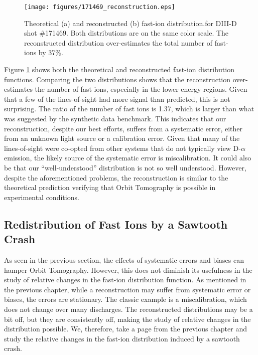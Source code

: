\begin{figure}[h!]
    \centering
    \texttt{[image: figures/171469\_reconstruction.eps]}
    \caption{Theoretical (a) and reconstructed (b) fast-ion distribution.for DIII-D shot \#171469. Both distributions are on the same color scale. The reconstructed distribution over-estimates the total number of fast-ions by 37\%.}
    \label{fig:d3d_reconstruction}
\end{figure}
Figure \ref{fig:d3d_reconstruction} shows both the theoretical and reconstructed fast-ion distribution functions. Comparing the two distributions shows that the reconstruction over-estimates the number of fast ions, especially in the lower energy regions. Given that a few of the lines-of-sight had more signal than predicted, this is not surprising. The ratio of the number of fast ions is 1.37, which is larger than what was suggested by the synthetic data benchmark. This indicates that our reconstruction, despite our best efforts, suffers from a systematic error, either from an unknown light source or a calibration error. Given that many of the lines-of-sight were co-opted from other systems that do not typically view D-$\alpha$ emission, the likely source of the systematic error is miscalibration. It could also be that our ``well-understood'' distribution is not so well understood. However, despite the aforementioned problems, the reconstruction is similar to the theoretical prediction verifying that Orbit Tomography is possible in experimental conditions. 

\subsection{Redistribution of Fast Ions by a Sawtooth Crash}
As seen in the previous section, the effects of systematic errors and biases can hamper Orbit Tomography. However, this does not diminish its usefulness in the study of relative changes in the fast-ion distribution function. As mentioned in the previous chapter, while a reconstruction may suffer from systematic error or biases, the errors are stationary. The classic example is a miscalibration, which does not change over many discharges. The reconstructed distributions may be a bit off, but they are consistently off, making the study of relative changes in the distribution possible. We, therefore, take a page from the previous chapter and study the relative changes in the fast-ion distribution induced by a sawtooth crash.

